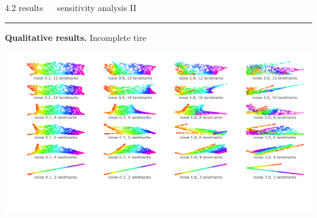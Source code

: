 \documentclass[11pt, compress, t, notes = noshow, xcolor = table, 
aspectratio = 1610]{beamer}
\begin{document}

\LARGE
\begin{frame}{\textcolor{gray!90}{4.2 results} ~~ sensitivity analysis II}
\normalsize
\vspace{-0.5cm}
\noindent \textcolor{gray!90}{\rule{\textwidth}{1pt}}
\smallskip

\textbf{Qualitative results.} Incomplete tire

\vspace{0.3cm}

\includegraphics[trim = 40 60 0 0, clip, %
    width = \textwidth]{figures/sensitivity_noise_qual_tire}

\end{frame}

\end{document}
